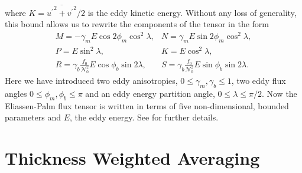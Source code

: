 \documentclass[12pt,a4paper]{report}
\newcommand*\mean[1]{\overline{#1}}
\newcommand*\res[1]{{#1}^{\prime}}
\begin{document}
                 where $K={\mean{{\res{u}}^{2} + {\res{v}}^{2}}}/{2}$ is the eddy
                 kinetic energy.
                 Without any loss of generality, this bound allows us to rewrite the components of the tensor in the form
                 \begin{equation}
                 \begin{array}{cc}
                 M = -\gamma_{m}E\cos{2\phi_{m}}\cos^{2}{\lambda}, & 
                 N = \gamma_{m}E\sin{2\phi_{m}}\cos^{2}{\lambda}, \\
                 P =  E\sin^{2}{\lambda}, &  K =  E\cos^{2}{\lambda},  \\
                 R =  \gamma_{b}\frac{f_{0}}{\mathcal{N}_{0}^{2}}E\cos{\phi_{b}}\sin{2\lambda}, &
                 S = \gamma_{b}\frac{f_{0}}{\mathcal{N}_{0}^{2}}E\sin{\phi_{b}}\sin{2\lambda} .
                 \end{array} 
                 \end{equation}
                 Here we have introduced two eddy anisotropies, $0\leq\gamma_{m},\gamma_{b}\leq1$, two eddy flux angles $0\leq\phi_{m},\phi_{b}\leq\pi$ and an eddy energy partition angle,
                 $0\leq\lambda\leq\pi/2$. Now the Eliassen-Palm flux tensor
                 is written in terms of five non-dimensional, bounded parameters
                 and $E$, the eddy energy. See \cite{marshall2012framework} for further details.
                 
                 
                 
                 \section{Thickness Weighted Averaging}
                 \label{youngtwa}
                 
\end{document}
